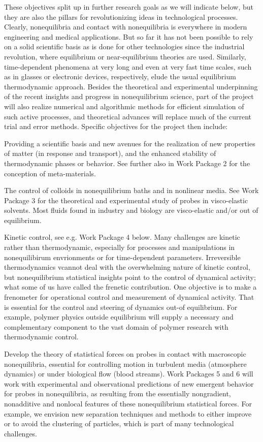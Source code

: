 These objectives split up in further research goals as we will indicate below, but they are
also the pillars for revolutionizing ideas in technological processes. Clearly,
nonequilibria and contact with nonequilibria is everywhere in modern engineering and medical
applications.
%
But so far it has not been possible to rely on a solid scientific basis as is done for other
technologies since the industrial revolution, where equilibrium or near-equilibrium theories
are used.
%
Similarly, time-dependent phenomena at very long and even at very fast time scales, such as in glasses
or electronic devices, respectively, elude the usual equilibrium thermodynamic
approach. Besides the theoretical and experimental underpinning of the recent insights and progress in nonequilibrium science, part of the project will also realize numerical and algorithmic methods for efficient
simulation of such active processes, and theoretical advances will replace much of the
current trial and error methods. Specific objectives for the project then include:
\begin{inparaenum}[A.]
	\item Providing a scientific basis and new avenues for the realization of new properties of matter (in response and transport), and the
	enhanced stability of thermodynamic phases or behavior.  See further also in Work Package 2 for the conception of meta-materials. 
	\item The control of colloids in nonequilibrium baths and in nonlinear media.  See Work Package 3 for the theoretical and experimental study of probes in visco-elastic solvents.
	Most fluids found in industry and biology are visco-elastic and/or out of equilibrium.
	\item Kinetic control, see e.g. Work Package 4 below.  Many challenges are kinetic rather than thermodynamic, especially for processes and manipulations in nonequilibirum envrionments or for time-dependent parameters.  Irreversible thermodynamics vcannot deal with the overwhelming nature of kinetic control, but nonequilibrium statistical insights point to the control of dynamical activity; what some of us have called the frenetic contribution.  One objective is to make a frenometer for operational control and measurement of dynamical activity.
	That is essential for the control and steering of dynamics out-of equilibrium.  For example, polymer physics outside equilibrium will supply a necessary and complementary component to the vast domain of polymer research with thermodynamic control.
	\item Develop the theory of statistical forces on probes in contact with macroscopic nonequilibria, essential for controlling motion in turbulent media (atmosphere dynamics) or under biological flow (blood streams).
	Work Packages 5 and 6 will work with experimental and observational predictions of new emergent behavior for probes in nonequilibria, as resulting from the essentially nongradient, nonadditive and nonlocal features of these nonequilibrium statistical forces.
For example, we envision new separation techniques and methods to either improve or to avoid the clustering of particles, which is part of many technological challenges.
\end{inparaenum}
